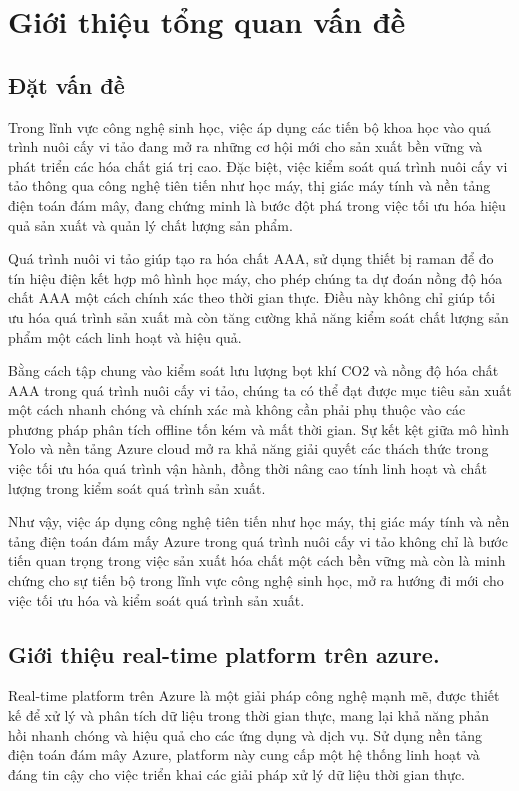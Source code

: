 \chapter{Giới thiệu tổng quan vấn đề}
	
\section{Đặt vấn đề}
Trong lĩnh vực công nghệ sinh học, việc áp dụng các tiến bộ khoa học vào quá trình nuôi cấy vi tảo đang mở ra những cơ hội mới cho sản xuất bền vững và phát triển các hóa chất giá trị cao. Đặc biệt, việc kiểm soát quá trình nuôi cấy vi tảo thông qua công nghệ tiên tiến như học máy, thị giác máy tính và nền tảng điện toán đám mây, đang chứng minh là bước đột phá trong việc tối ưu hóa hiệu quả sản xuất và quản lý chất lượng sản phẩm.

Quá trình nuôi vi tảo giúp tạo  ra hóa chất AAA, sử dụng thiết bị raman để đo tín hiệu điện kết hợp mô hình học máy, cho phép chúng ta dự đoán nồng độ hóa chất AAA một cách chính xác theo thời gian thực. Điều này không chỉ giúp tối ưu hóa quá trình sản xuất mà còn tăng cường khả năng kiểm soát chất lượng sản phẩm một cách linh hoạt và hiệu quả.

Bằng cách tập chung vào kiểm soát lưu lượng bọt khí CO2 và nồng độ hóa chất AAA trong quá trình nuôi cấy vi tảo, chúng ta có thể đạt được mục tiêu sản xuất một cách nhanh chóng và chính xác mà không cần phải phụ thuộc vào các phương pháp phân tích offline tốn kém và mất thời gian. Sự kết kệt giữa mô hình Yolo và nền tảng Azure cloud mở ra khả năng giải quyết các thách thức trong việc tối ưu hóa quá trình vận hành, đồng thời nâng cao tính linh hoạt và chất lượng trong kiểm soát quá trình sản xuất.

Như vậy, việc áp dụng công nghệ tiên tiến như học máy, thị giác máy tính và nền tảng điện toán đám mấy Azure trong quá trình nuôi cấy vi tảo không chỉ là bước tiến quan trọng trong việc sản xuất hóa chất một cách bền vững mà còn là minh chứng cho sự tiến bộ trong lĩnh vực công nghệ sinh học, mở ra hướng đi mới cho việc tối ưu hóa và kiểm soát quá trình sản xuất.
\section{Giới thiệu real-time platform trên azure.}
Real-time platform  trên Azure là một giải pháp công nghệ mạnh mẽ, được thiết kế để xử lý và phân tích dữ liệu trong thời gian thực, mang lại khả năng phản hồi nhanh chóng và hiệu quả cho các ứng dụng và dịch vụ.
Sử dụng nền tảng điện toán đám mây Azure, platform này cung cấp một hệ thống linh hoạt và đáng tin cậy cho việc triển khai các giải pháp xử lý dữ liệu thời gian thực.
\newpage

